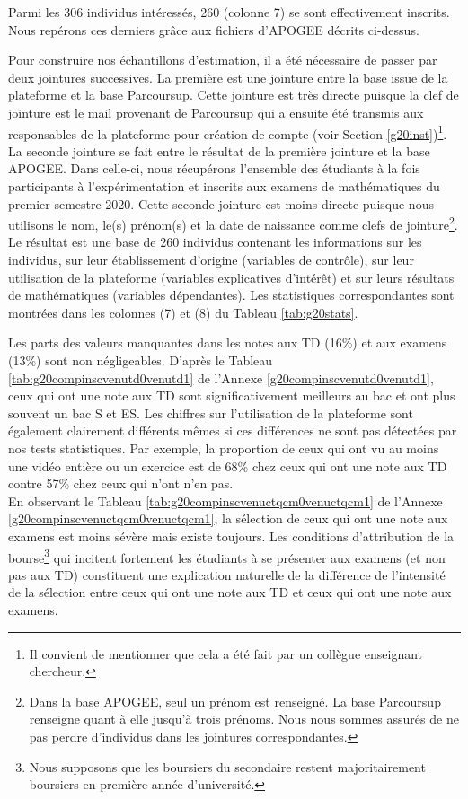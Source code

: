 \documentclass[
]{book}
\begin{document}
\quad Parmi les 306 individus intéressés, 260 (colonne 7) se sont effectivement inscrits. Nous repérons ces derniers grâce aux fichiers d'APOGEE décrits ci-dessus.

\quad Pour construire nos échantillons d'estimation, il a été nécessaire de passer par deux jointures successives. La première est une jointure entre la base issue de la plateforme et la base Parcoursup. Cette jointure est très directe puisque la clef de jointure est le mail provenant de Parcoursup qui a ensuite été transmis aux responsables de la plateforme pour création de compte (voir Section \ref{g20inst})\footnote{Il convient de mentionner que cela a été fait par un collègue enseignant chercheur.}. La seconde jointure se fait entre le résultat de la première jointure et la base APOGEE. Dans celle-ci, nous récupérons l'ensemble des étudiants à la fois participants à l'expérimentation et inscrits aux examens de mathématiques du premier semestre 2020. Cette seconde jointure est moins directe puisque nous utilisons le nom, le(s) prénom(s) et la date de naissance comme clefs de jointure\footnote{Dans la base APOGEE, seul un prénom est renseigné. La base Parcoursup renseigne quant à elle jusqu'à trois prénoms. Nous nous sommes assurés de ne pas perdre d'individus dans les jointures correspondantes.}. Le résultat est une base de 260 individus contenant les informations sur les individus, sur leur établissement d'origine (variables de contrôle), sur leur utilisation de la plateforme (variables explicatives d'intérêt) et sur leurs résultats de mathématiques (variables dépendantes). Les statistiques correspondantes sont montrées dans les colonnes (7) et (8) du Tableau \ref{tab:g20stats}.

Les parts des valeurs manquantes dans les notes aux TD (16\%) et aux examens (13\%) sont non négligeables. D'après le Tableau \ref{tab:g20compinscvenutd0venutd1} de l'Annexe \ref{g20compinscvenutd0venutd1}, ceux qui ont une note aux TD sont significativement meilleurs au bac et ont plus souvent un bac S et ES. Les chiffres sur l'utilisation de la plateforme sont également clairement différents mêmes si ces différences ne sont pas détectées par nos tests statistiques. Par exemple, la proportion de ceux qui ont vu au moins une vidéo entière ou un exercice est de 68\% chez ceux qui ont une note aux TD contre 57\% chez ceux qui n'ont n'en pas.\\
En observant le Tableau \ref{tab:g20compinscvenuctqcm0venuctqcm1} de l'Annexe \ref{g20compinscvenuctqcm0venuctqcm1}, la sélection de ceux qui ont une note aux examens est moins sévère mais existe toujours. Les conditions d'attribution de la bourse\footnote{Nous supposons que les boursiers du secondaire restent majoritairement boursiers en première année d'université.} qui incitent fortement les étudiants à se présenter aux examens (et non pas aux TD) constituent une explication naturelle de la différence de l'intensité de la sélection entre ceux qui ont une note aux TD et ceux qui ont une note aux examens.
\end{document}
